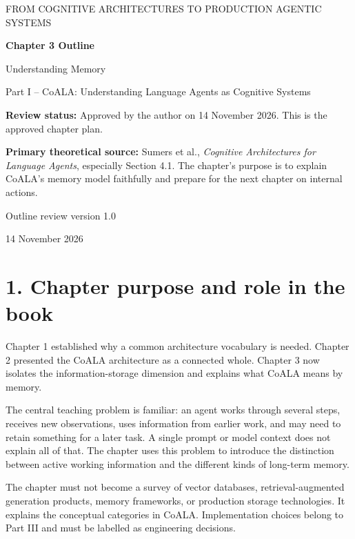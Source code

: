 


\thispagestyle{empty}
\begin{center}
{\sffamily\Large\color{BookBlue} FROM COGNITIVE ARCHITECTURES TO PRODUCTION AGENTIC SYSTEMS\par}
\vspace{1.2cm}
{\sffamily\huge\bfseries\color{BookBlue} Chapter 3 Outline\par}
\vspace{0.45cm}
{\sffamily\LARGE Understanding Memory\par}
\vspace{0.8cm}
{\large Part I -- CoALA: Understanding Language Agents as Cognitive Systems\par}
\vfill
\begin{learningbox}
\textbf{Review status:} Approved by the author on 14 November 2026. This is the approved chapter plan.

\textbf{Primary theoretical source:} Sumers et al., \emph{Cognitive Architectures for Language Agents}, especially Section 4.1. The chapter's purpose is to explain CoALA's memory model faithfully and prepare for the next chapter on internal actions.
\end{learningbox}
\vfill
{\sffamily\large Outline review version 1.0\par}
{\small 14 November 2026\par}
\end{center}
\clearpage
\section*{1. Chapter purpose and role in the book}
Chapter 1 established why a common architecture vocabulary is needed. Chapter 2 presented the CoALA architecture as a connected whole. Chapter 3 now isolates the information-storage dimension and explains what CoALA means by memory.

The central teaching problem is familiar: an agent works through several steps, receives new observations, uses information from earlier work, and may need to retain something for a later task. A single prompt or model context does not explain all of that. The chapter uses this problem to introduce the distinction between active working information and the different kinds of long-term memory.

The chapter must not become a survey of vector databases, retrieval-augmented generation products, memory frameworks, or production storage technologies. It explains the conceptual categories in CoALA. Implementation choices belong to Part III and must be labelled as engineering decisions.

